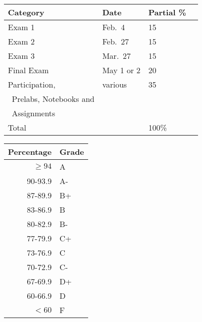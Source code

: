 \documentclass{tufte-handout}
\begin{document}
\begin{tabular}{l l l r}
Category &  Date & Partial \%  \\
\hline
 Exam 1 & Feb.\ 4 & 15 \\							%
 Exam 2 & Feb.\ 27 & 15 \\							%
 Exam 3 & Mar.\ 27 & 15 \\						%
 Final Exam & May 1 or 2 & 20 \\ 							%
Participation,  &  various  & 35 \\
\, Prelabs, Notebooks and \\
\, Assignments \\
\hline
Total & &   100\%
\end{tabular}


\begin{margintable}
\begin{tabular}{rl}
Percentage & Grade \\
\hline 
$\ge94$ & A \\
90-93.9 & A- \\
87-89.9 & B+ \\
83-86.9 & B \\
80-82.9 & B- \\
77-79.9 & C+ \\
73-76.9 & C \\
70-72.9 & C- \\
67-69.9 & D+ \\
60-66.9 & D \\
$<60$ & F \\
\hline
\end{tabular}
\end{margintable}
\end{document}
